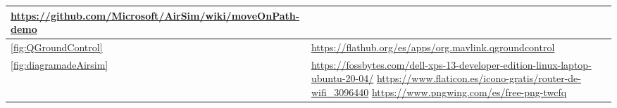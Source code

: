 \begin{tabular}{ | m{4cm} | m{10cm}| m{1cm} | }
    \url{https://github.com/Microsoft/AirSim/wiki/moveOnPath-demo} \\
    \hline
    \ref{fig:QGroundControl} & \url{https://flathub.org/es/apps/org.mavlink.qgroundcontrol} \\
    \hline
    \ref{fig:diagramadeAirsim} & \url{https://fossbytes.com/dell-xps-13-developer-edition-linux-laptop-ubuntu-20-04/}  \newline
    \url{https://www.flaticon.es/icono-gratis/router-de-wifi_3096440} \newline
    \url{https://www.pngwing.com/es/free-png-twcfq} \\
    \hline





\end{tabular}




